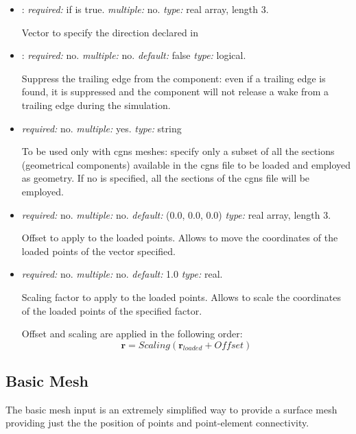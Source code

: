 \begin{itemize}
\item {}: \textit{required:} if  is true. \textit{multiple:} no. \textit{type:} real array, length 3.

Vector to specify the direction declared in 

\item {}: \textit{required:} no. \textit{multiple:} no. \textit{default:} false \textit{type:} logical.

Suppress the trailing edge from the component: even if a trailing edge is found, it is suppressed and the component will not release a wake from a trailing edge during the simulation.

\item {} \textit{required:} no. \textit{multiple:} yes. \textit{type:} string 

To be used only with cgns meshes: specify only a subset of all the sections (geometrical components) available in the cgns file to be loaded and employed as geometry. If no  is specified, all the sections of the cgns file will be employed.

\item {} \textit{required:} no. \textit{multiple:} no. \textit{default:} (0.0, 0.0, 0.0) \textit{type:} real array, length 3.

Offset to apply to the loaded points. Allows to move the coordinates of the loaded points of the vector specified. 

\item {} \textit{required:} no. \textit{multiple:} no. \textit{default:} 1.0 \textit{type:} real.

Scaling factor to apply to the loaded points. Allows to scale the coordinates of the loaded points of the specified factor.

Offset and scaling are applied in the following order:
\begin{equation*}
\mathbf{r} = Scaling (\mathbf{r}_{loaded}+Offset)
\end{equation*}
\end{itemize}

\subsection{Basic Mesh}
\label{subsec:Basic_Mesh}

The basic mesh input is an extremely simplified way to provide a surface mesh providing just the the position of points and point-element connectivity. 

